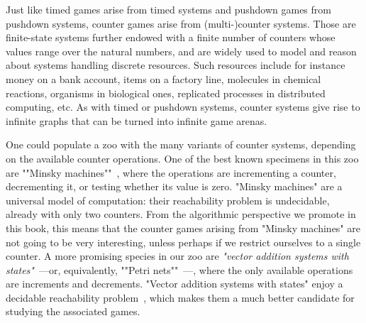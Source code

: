 

Just like timed games arise from timed systems and pushdown games
from pushdown systems, counter games arise from (multi-)counter
systems.  Those are finite-state systems further endowed with a
finite number of counters whose values range over the natural numbers,
and are widely used to model and reason about systems handling
discrete resources.  Such resources include for instance money on a
bank account, items on a factory line, molecules in chemical
reactions, organisms in biological ones, replicated processes in
distributed computing, etc.  As with timed or pushdown systems,
counter systems give rise to infinite graphs that can be turned into
infinite game arenas.

\AP One could populate a zoo with the many variants of counter systems,
depending on the available counter operations.  One of the best known
specimens in this zoo are ""Minsky machines""~\cite{Minsky:1967},
where the operations are incrementing a counter, decrementing it, or
testing whether its value is zero.  "Minsky machines" are a universal
model of computation: their reachability problem is undecidable,
already with only two counters.  From the algorithmic perspective we
promote in this book, this means that the counter games arising from
"Minsky machines" are not going to be very interesting, unless perhaps
if we restrict ourselves to a single counter.  A more promising
species in our zoo are \emph{"vector addition systems with
  states"}~\cite{Greibach:1978,Hopcroft&Pansiot:1979}---or,
equivalently, ""Petri nets""~\cite{Petri:1962}---, where the only
available operations are increments and decrements.  "Vector addition
systems with states" enjoy a decidable reachability
problem~\cite{Mayr:1981,Kosaraju:1982,Lambert:1992,Leroux:2011}, which
makes them a much better candidate for studying the associated games.

